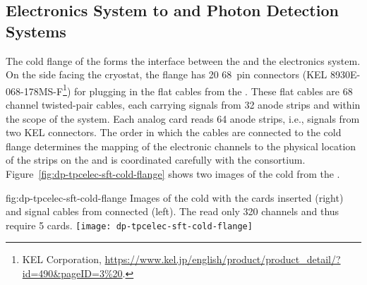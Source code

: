 \subsection{Electronics System to  and Photon Detection Systems}
\label{ssec:dp-tpcelec-intfc-crppmt}

The cold \fdth flange of the  forms the interface between the  and the  electronics system. On the side facing the cryostat, the flange  has \num{20} \num{68}\, pin connectors (KEL 8930E-068-178MS-F\footnote{KEL Corporation\texttrademark{}, \url{https://www.kel.jp/english/product/product_detail/?id=490\&pageID=3\%20}.}) for plugging in the flat cables from the . These flat cables are \num{68}\, channel twisted-pair cables, each carrying signals from \num{32} anode strips and within the scope of the  system. Each analog  card reads \num{64} anode strips, i.e., signals from two KEL connectors. The order in which the cables are connected to the cold flange determines the mapping of the electronic channels to the physical location of the strips on the  and is coordinated carefully with the  consortium. Figure~\ref{fig:dp-tpcelec-sft-cold-flange} shows two images of the cold \fdth from the .

\begin{dunefigure}{fig:dp-tpcelec-sft-cold-flange}
{Images of the   cold \fdth with the  cards inserted (right) and signal cables from  connected (left). The   read only \num{320} channels and thus require \num{5}  cards. }%
\texttt{[image: dp-tpcelec-sft-cold-flange]}
\end{dunefigure}


